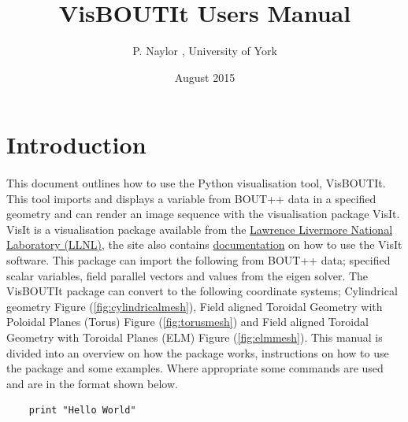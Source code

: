 \documentclass[12pt,a4paper]{article}
\author{P. Naylor , University of York}
\title{VisBOUTIt Users Manual}
\date{August 2015}
\begin{document}
	\maketitle
	\tableofcontents
	\section{Introduction}
	\paragraph{}
	This document outlines how to use the Python visualisation tool, VisBOUTIt. This tool imports and displays a variable from BOUT++ data in a specified geometry and can render an image sequence with the visualisation package VisIt. VisIt is a visualisation package available from the \href{https://wci.llnl.gov/simulation/computer-codes/visit}{Lawrence Livermore National Laboratory (LLNL)}, the site also contains \href{https://wci.llnl.gov/simulation/computer-codes/visit/manuals}{documentation} on how to use the VisIt software.  This package can import the following from BOUT++ data; specified scalar variables, field parallel vectors and values from the eigen solver. The VisBOUTIt package can convert to the following coordinate systems; Cylindrical geometry Figure (\ref{fig:cylindricalmesh}), Field aligned Toroidal Geometry with Poloidal Planes (Torus) Figure (\ref{fig:torusmesh}) and Field aligned Toroidal Geometry with Toroidal Planes (ELM) Figure (\ref{fig:elmmesh}). 	This manual is divided into an overview on how the package works, instructions on how to use the package and some examples. Where appropriate some commands are used and are in the format shown below.
	
	\begin{verbatim}
	print "Hello World"
	\end{verbatim}
\end{document}
